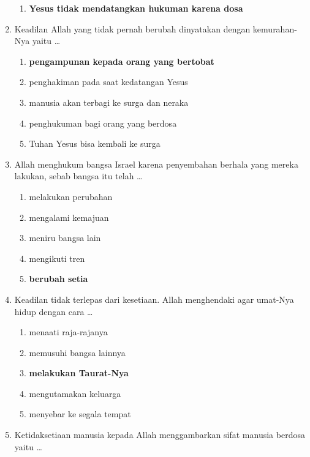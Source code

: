 \documentclass[12pt]{article}
\begin{document}
\begin{enumerate}
\begin{enumerate}
                \item \textbf{Yesus tidak mendatangkan hukuman karena dosa}
            \end{enumerate}
        \item Keadilan Allah yang tidak pernah berubah dinyatakan 
            dengan kemurahan-Nya yaitu \dots
            \begin{enumerate}
                \item \textbf{pengampunan kepada orang yang bertobat}
                \item penghakiman pada saat kedatangan Yesus
                \item manusia akan terbagi ke surga dan neraka
                \item penghukuman bagi orang yang berdosa
                \item Tuhan Yesus bisa kembali ke surga
            \end{enumerate}
        \item Allah menghukum bangsa Israel karena penyembahan berhala yang mereka lakukan,
            sebab bangsa itu telah \dots
            \begin{enumerate}
                \item melakukan perubahan
                \item mengalami kemajuan
                \item meniru bangsa lain
                \item mengikuti tren
                \item \textbf{berubah setia}
            \end{enumerate}
        \item Keadilan tidak terlepas dari kesetiaan. Allah menghendaki
            agar umat-Nya hidup dengan cara \dots
            \begin{enumerate}
                \item menaati raja-rajanya
                \item memusuhi bangsa lainnya
                \item \textbf{melakukan Taurat-Nya}
                \item mengutamakan keluarga
                \item menyebar ke segala tempat
            \end{enumerate}
        \item Ketidaksetiaan manusia kepada Allah menggambarkan sifat manusia berdosa yaitu \dots
            \begin{enumerate}

\end{enumerate}
\end{enumerate}
\end{document}
